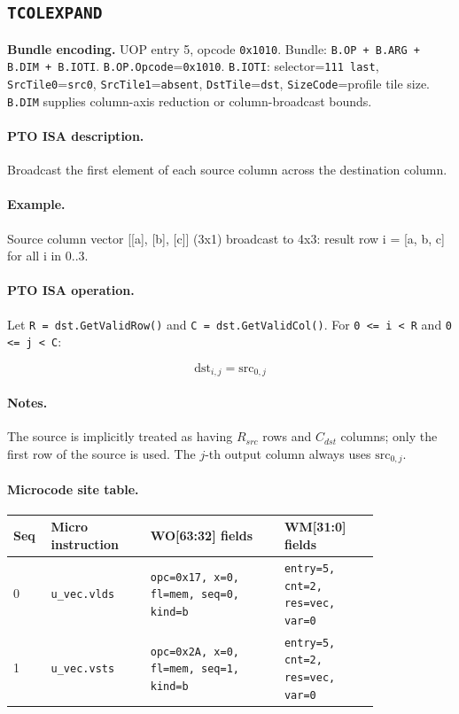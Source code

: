 \subsection{\texttt{TCOLEXPAND}}
\noindent\textbf{Bundle encoding.} UOP entry 5, opcode \texttt{0x1010}. Bundle: \texttt{B.OP + B.ARG + B.DIM + B.IOTI}. \texttt{B.OP.Opcode}=\texttt{0x1010}. \texttt{B.IOTI}: selector=\texttt{111 last}, \texttt{SrcTile0}=\texttt{src0}, \texttt{SrcTile1}=\texttt{absent}, \texttt{DstTile}=\texttt{dst}, \texttt{SizeCode}=profile tile size. \texttt{B.DIM} supplies column-axis reduction or column-broadcast bounds.\par\smallskip
{\small
\paragraph{PTO ISA description.}
Broadcast the first element of each source column across the destination column.
\paragraph{Example.}
Source column vector [[a], [b], [c]] (3x1) broadcast to 4x3: result row i = [a, b, c] for all i in 0..3.
\par\smallskip
\paragraph{PTO ISA operation.}
Let \texttt{R = dst.GetValidRow()} and \texttt{C = dst.GetValidCol()}. For \texttt{0 \textless{}= i \textless{} R} and \texttt{0 \textless{}= j \textless{} C}:

\[
\mathrm{dst}_{i,j} = \mathrm{src}_{0,j}
\]
}\par\smallskip
\paragraph{Notes.}
The source is implicitly treated as having $R_{src}$ rows and $C_{dst}$ columns; only the first row of the source is used. The $j$-th output column always uses $\mathrm{src}_{0,j}$.
\paragraph{Microcode site table.}
{\scriptsize
\begin{longtable}{@{}R{0.055\linewidth}L{0.23\linewidth}L{0.31\linewidth}L{0.22\linewidth}@{}}
\toprule
Seq & Micro instruction & WO[63:32] fields & WM[31:0] fields \\
 & \texttt{u\_vec.vlds} & \texttt{opc=0x17, x=0, fl=mem, seq=0, kind=b} & \texttt{entry=5, cnt=2, res=vec, var=0} \\
1 & \texttt{u\_vec.vsts} & \texttt{opc=0x2A, x=0, fl=mem, seq=1, kind=b} & \texttt{entry=5, cnt=2, res=vec, var=0} \\
\bottomrule
\end{longtable}
}
